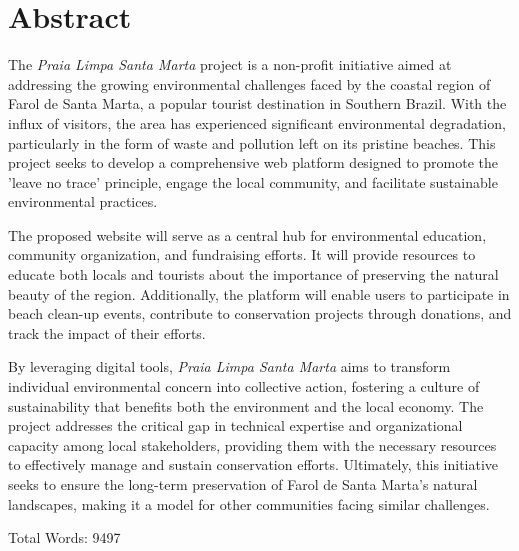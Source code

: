 \chapter*{Abstract}

The \textit{Praia Limpa Santa Marta} project is a non-profit initiative aimed at addressing the growing environmental challenges faced by the coastal region of Farol de Santa Marta, a popular tourist destination in Southern Brazil. With the influx of visitors, the area has experienced significant environmental degradation, particularly in the form of waste and pollution left on its pristine beaches. This project seeks to develop a comprehensive web platform designed to promote the 'leave no trace' principle, engage the local community, and facilitate sustainable environmental practices. 

The proposed website will serve as a central hub for environmental education, community organization, and fundraising efforts. It will provide resources to educate both locals and tourists about the importance of preserving the natural beauty of the region. Additionally, the platform will enable users to participate in beach clean-up events, contribute to conservation projects through donations, and track the impact of their efforts. 

By leveraging digital tools, \textit{Praia Limpa Santa Marta} aims to transform individual environmental concern into collective action, fostering a culture of sustainability that benefits both the environment and the local economy. The project addresses the critical gap in technical expertise and organizational capacity among local stakeholders, providing them with the necessary resources to effectively manage and sustain conservation efforts. Ultimately, this initiative seeks to ensure the long-term preservation of Farol de Santa Marta's natural landscapes, making it a model for other communities facing similar challenges. 
 
Total Words: 9497

